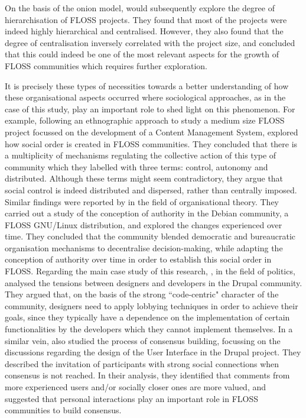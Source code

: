 On the basis of the onion model, \textcite{crowston2006hierarchy} would subsequently explore the degree of hierarchisation of FLOSS projects. They found that most of the projects were indeed highly hierarchical and centralised. However, they also found that the degree of centralisation inversely correlated with the project size, and concluded that this could indeed be one of the most relevant aspects for the growth of FLOSS communities which requires further exploration.
 
It is precisely these types of necessities towards a better understanding of how these organisational aspects occurred where sociological approaches, as in the case of this study, play an important role to shed light on this phenomenon. For example, following an ethnographic approach to study a medium size FLOSS project focussed on the development of a Content Management System, \textcite{demaziere2007functioning} explored how social order is created in FLOSS communities. They concluded that there is a multiplicity of mechanisms regulating the collective action of this type of community which they labelled with three terms: control, autonomy and distributed. Although these terms might seem contradictory, they argue that social control is indeed distributed and dispersed, rather than centrally imposed. Similar findings were reported by \textcite{o2007emergence} in the field of organisational theory. They carried out a study of the conception of authority in the Debian community, a FLOSS GNU/Linux distribution, and explored the changes experienced over time. They concluded that the community blended democratic and bureaucratic organisation mechanisms to decentralise decision-making, while adapting the conception of authority over time in order to establish this social order in FLOSS. Regarding the main case study of this research, \textcite{Zilouchian2011}, in the field of politics, analysed the tensions between designers and developers in the Drupal community. They argued that, on the basis of the strong ``code-centric" character of the community, designers need to apply lobbying techniques in order to achieve their goals, since they typically have a dependence on the implementation of certain functionalities by the developers which they cannot implement themselves. In a similar vein, \textcite{Moghaddam2012} also studied the process of consensus building, focussing on the discussions regarding the design of the User Interface in the Drupal project. They described the invitation of participants with strong social connections when consensus is not reached. In their analysis, they identified that comments from more experienced users and\slash or socially closer ones are more valued, and suggested that personal interactions play an important role in FLOSS communities to build consensus.
 

